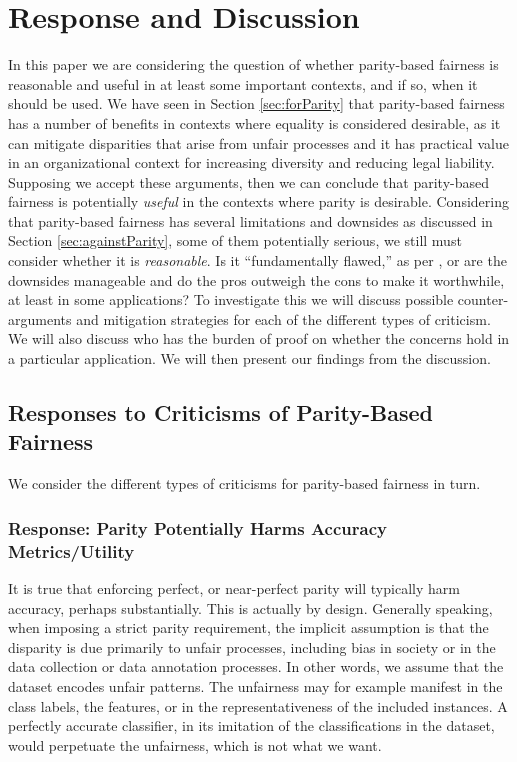 \documentclass[11pt,dvipdfm]{article}
\begin{document}
\section{Response and Discussion}
In this paper we are considering the question of whether parity-based fairness is reasonable and useful in at least some important contexts, and if so, when it should be used.  We have seen in Section \ref{sec:forParity} that parity-based fairness has a number of benefits in contexts where equality is considered desirable, as it can mitigate disparities that arise from unfair processes and it has practical value in an organizational context for increasing diversity and reducing legal liability.  Supposing we accept these arguments, then we can conclude that parity-based fairness is potentially \emph{useful} in the contexts where parity is desirable.  Considering that parity-based fairness has several limitations and downsides as discussed in Section \ref{sec:againstParity}, some of them potentially serious, we still must consider whether it is \emph{reasonable}.  Is it ``fundamentally flawed,'' as per \cite{Hardt2016approaching}, or are the downsides manageable and do the pros outweigh the cons to make it worthwhile, at least in some applications?  To investigate this we will discuss possible counter-arguments and mitigation strategies for each of the different types of criticism.  We will also discuss who has the burden of proof on whether the concerns hold in a particular application.  We will then present our findings from the discussion. 

\subsection{Responses to Criticisms of Parity-Based Fairness}
We consider the different types of criticisms for parity-based fairness in turn.  

\subsubsection{Response: Parity Potentially Harms Accuracy Metrics/Utility}
It is true that enforcing perfect, or near-perfect parity will typically harm accuracy, perhaps substantially.  This is actually by design.  Generally speaking, when imposing a strict parity requirement, the implicit assumption is that the disparity is due primarily to unfair processes, including bias in society or in the data collection or data annotation processes.  In other words, we assume that the dataset encodes unfair patterns.  The unfairness may for example manifest in the class labels, the features, or in the representativeness of the included instances. 
A perfectly accurate classifier, in its imitation of the classifications in the dataset, would perpetuate the unfairness, which is not what we want.
\end{document}
